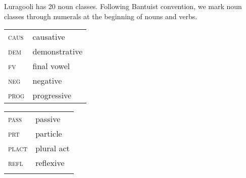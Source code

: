 \documentclass[output=paper]{langsci/lanmgscibook}
\begin{document}
Luragooli has 20 noun classes. Following Bantuist convention, we mark noun classes through numerals at the beginning of nouns and verbs. 

\begin{tabularx}{.45\textwidth}{lX}
\textsc{caus} & causative  \\
\textsc{dem} & demonstrative  \\
\textsc{fv} & final vowel \\
\textsc{neg} & negative    \\
\textsc{prog} & progressive  \\
\end{tabularx}
\begin{tabularx}{.45\textwidth}{lX}
\textsc{pass} & passive  \\
\textsc{prt} & particle    \\
\textsc{plact} & plural act  \\
\textsc{refl} & reflexive \\
\\
\end{tabularx}


\printbibliography[heading=subbibliography,notkeyword=this]
\end{document}
